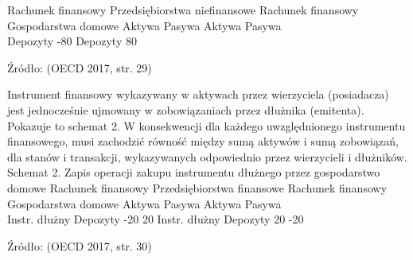 \documentclass[
]{book}
\begin{document}
Rachunek finansowy
Przedsiębiorstwa niefinansowe Rachunek finansowy
Gospodarstwa domowe
Aktywa Pasywa Aktywa Pasywa\\
Depozyty -80 Depozyty 80

Źródło: (OECD 2017, str. 29)

Instrument finansowy wykazywany w aktywach przez wierzyciela (posiadacza) jest jednocześnie ujmowany w zobowiązaniach przez dłużnika (emitenta). Pokazuje to schemat 2. W konsekwencji dla każdego uwzględnionego instrumentu finansowego, musi zachodzić równość między sumą aktywów i sumą zobowiązań, dla stanów i transakcji, wykazywanych odpowiednio przez wierzycieli i dłużników.
Schemat 2. Zapis operacji zakupu instrumentu dłużnego przez gospodarstwo domowe
Rachunek finansowy
Przedsiębiorstwa finansowe Rachunek finansowy
Gospodarstwa domowe
Aktywa Pasywa Aktywa Pasywa\\
Instr. dłużny
Depozyty -20
20 Instr. dłużny
Depozyty 20
-20

Źródło: (OECD 2017, str. 30)
\end{document}
